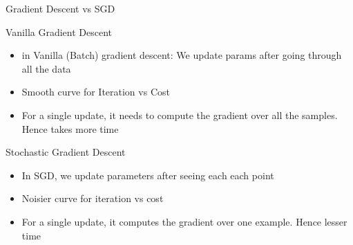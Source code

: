 \documentclass{beamer}
\begin{document}
	
	\begin{frame}{Gradient Descent vs SGD}

	
	
	
	Vanilla Gradient Descent
	\begin{itemize}[<+->]
		\item 
		in Vanilla (Batch) gradient descent: We update params after going through all the data 
		\item Smooth curve for Iteration vs Cost
		\item For a single update, it needs to compute the gradient over all the samples. Hence takes more time
		
	\end{itemize}
	
	\pause Stochastic Gradient Descent
	\begin{itemize}[<+->]
		\item In SGD, we update parameters after seeing each each point
		\item Noisier curve for iteration vs cost 
		\item  For a single update, it computes the gradient over one example. Hence lesser time
	\end{itemize}
	
	
\end{frame}

	
	
	
	
\end{document}
